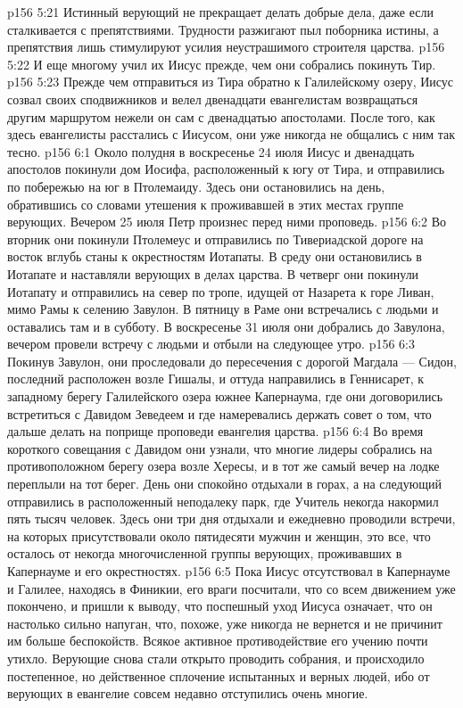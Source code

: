 \vs p156 5:21 Истинный верующий не прекращает делать добрые дела, даже если сталкивается с препятствиями. Трудности разжигают пыл поборника истины, а препятствия лишь стимулируют усилия неустрашимого строителя царства.
\vs p156 5:22 \pc И еще многому учил их Иисус прежде, чем они собрались покинуть Тир.
\vs p156 5:23 Прежде чем отправиться из Тира обратно к Галилейскому озеру, Иисус созвал своих сподвижников и велел двенадцати евангелистам возвращаться другим маршрутом нежели он сам с двенадцатью апостолами. После того, как здесь евангелисты расстались с Иисусом, они уже никогда не общались с ним так тесно.
\vs p156 6:1 Около полудня в воскресенье 24 июля Иисус и двенадцать апостолов покинули дом Иосифа, расположенный к югу от Тира, и отправились по побережью на юг в Птолемаиду. Здесь они остановились на день, обратившись со словами утешения к проживавшей в этих местах группе верующих. Вечером 25 июля Петр произнес перед ними проповедь.
\vs p156 6:2 Во вторник они покинули Птолемеус и отправились по Тивериадской дороге на восток вглубь станы к окрестностям Иотапаты. В среду они остановились в Иотапате и наставляли верующих в делах царства. В четверг они покинули Иотапату и отправились на север по тропе, идущей от Назарета к горе Ливан, мимо Рамы к селению Завулон. В пятницу в Раме они встречались с людьми и оставались там и в субботу. В воскресенье 31 июля они добрались до Завулона, вечером провели встречу с людьми и отбыли на следующее утро.
\vs p156 6:3 Покинув Завулон, они проследовали до пересечения с дорогой Магдала --- Сидон, последний расположен возле Гишалы, и оттуда направились в Геннисарет, к западному берегу Галилейского озера южнее Капернаума, где они договорились встретиться с Давидом Зеведеем и где намеревались держать совет о том, что дальше делать на поприще проповеди евангелия царства.
\vs p156 6:4 Во время короткого совещания с Давидом они узнали, что многие лидеры собрались на противоположном берегу озера возле Хересы, и в тот же самый вечер на лодке переплыли на тот берег. День они спокойно отдыхали в горах, а на следующий отправились в расположенный неподалеку парк, где Учитель некогда накормил пять тысяч человек. Здесь они три дня отдыхали и ежедневно проводили встречи, на которых присутствовали около пятидесяти мужчин и женщин, это все, что осталось от некогда многочисленной группы верующих, проживавших в Капернауме и его окрестностях.
\vs p156 6:5 \pc Пока Иисус отсутствовал в Капернауме и Галилее, находясь в Финикии, его враги посчитали, что со всем движением уже покончено, и пришли к выводу, что поспешный уход Иисуса означает, что он настолько сильно напуган, что, похоже, уже никогда не вернется и не причинит им больше беспокойств. Всякое активное противодействие его учению почти утихло. Верующие снова стали открыто проводить собрания, и происходило постепенное, но действенное сплочение испытанных и верных людей, ибо от верующих в евангелие совсем недавно отступились очень многие.
